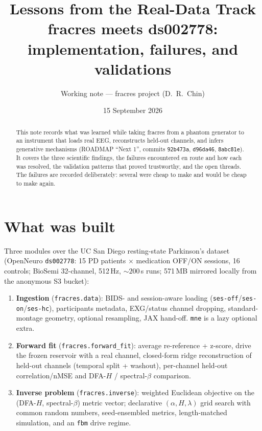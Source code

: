 \documentclass[11pt]{article}
\title{Lessons from the Real-Data Track\\
\large fracres meets ds002778: implementation, failures, and validations}
\author{Working note --- fracres project (D.~R.~Chin)}
\date{15 September 2026}
\begin{document}
\maketitle

\begin{abstract}
\noindent This note records what was learned while taking fracres from a
phantom generator to an instrument that loads real EEG, reconstructs
held-out channels, and infers generative mechanisms (ROADMAP ``Next 1'',
commits \texttt{92b473a}, \texttt{d96da46}, \texttt{8abc81e}). It covers the
three scientific findings, the failures encountered en route and how each was
resolved, the validation patterns that proved trustworthy, and the open
threads. The failures are recorded deliberately: several were cheap to make
and would be cheap to make again.
\end{abstract}

\section{What was built}

Three modules over the UC San Diego resting-state Parkinson's dataset
(OpenNeuro \texttt{ds002778}: 15 PD patients $\times$ medication OFF/ON
sessions, 16 controls; BioSemi 32-channel, 512\,Hz, ${\sim}200$\,s runs;
571\,MB mirrored locally from the anonymous S3 bucket):

\begin{enumerate}[leftmargin=1.6em]
  \item \textbf{Ingestion} (\texttt{fracres.data}): BIDS- and session-aware
        loading (\texttt{ses-off}/\texttt{ses-on}/\texttt{ses-hc}),
        participants metadata, EXG/status channel dropping, standard-montage
        geometry, optional resampling, JAX hand-off. \texttt{mne} is a lazy
        optional extra.
  \item \textbf{Forward fit} (\texttt{fracres.forward\_fit}): average
        re-reference + z-score, drive the frozen reservoir with a real channel,
        closed-form ridge reconstruction of held-out channels (temporal split
        + washout), per-channel held-out correlation/nMSE and DFA-$H$ /
        spectral-$\beta$ comparison.
  \item \textbf{Inverse problem} (\texttt{fracres.inverse}): weighted Euclidean
        objective on the (DFA-$H$, spectral-$\beta$) metric vector;
        declarative $(\alpha, H, \lambda)$ grid search with common random
        numbers, seed-ensembled metrics, length-matched simulation, and an
        \texttt{fbm} drive regime.
\end{enumerate}
\end{document}
